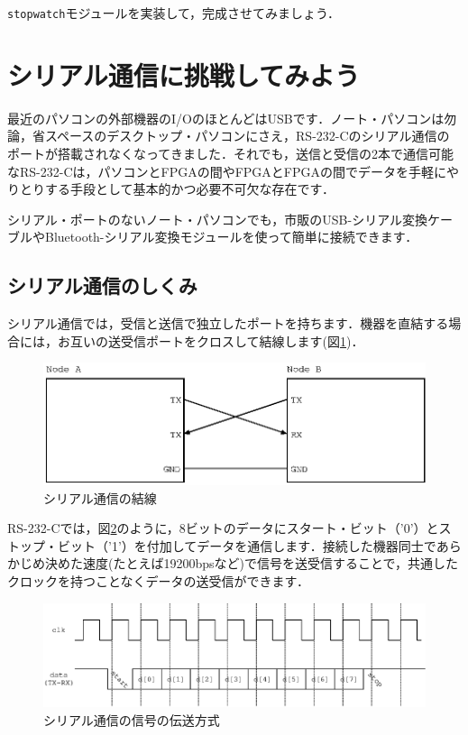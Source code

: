 \documentclass[a4paper,dvipdfmx]{jsarticle}
\begin{document}
\verb|stopwatch|モジュールを実装して，完成させてみましょう．

\section{シリアル通信に挑戦してみよう}

最近のパソコンの外部機器のI/OのほとんどはUSBです．ノート・パソコンは勿論，省スペースのデスクトップ・パソコンにさえ，RS-232-Cのシリアル通信のポートが搭載されなくなってきました．それでも，送信と受信の2本で通信可能なRS-232-Cは，パソコンとFPGAの間やFPGAとFPGAの間でデータを手軽にやりとりする手段として基本的かつ必要不可欠な存在です．

シリアル・ポートのないノート・パソコンでも，市販のUSB-シリアル変換ケーブルやBluetooth-シリアル変換モジュールを使って簡単に接続できます．

\subsection{シリアル通信のしくみ}
シリアル通信では，受信と送信で独立したポートを持ちます．機器を直結する場合には，お互いの送受信ポートをクロスして結線します(図\ref{fig:serial_comm})．

 \begin{figure}[H]
  \begin{center}
   \includegraphics[width=.6\textwidth]{chapter06_figures/serial_comm.eps}
  \end{center}  
  \caption{シリアル通信の結線\label{fig:serial_comm}}
 \end{figure}

RS-232-Cでは，図\ref{fig:serial_comm_format}のように，8ビットのデータにスタート・ビット（'0'）とストップ・ビット（'1'）を付加してデータを通信します．接続した機器同士であらかじめ決めた速度(たとえば19200bpsなど)で信号を送受信することで，共通したクロックを持つことなくデータの送受信ができます．

 \begin{figure}[H]
  \begin{center}
   \includegraphics[width=.6\textwidth]{chapter06_figures/serial_comm_format.eps}
  \end{center}  
  \caption{シリアル通信の信号の伝送方式\label{fig:serial_comm_format}}
 \end{figure}
\end{document}
